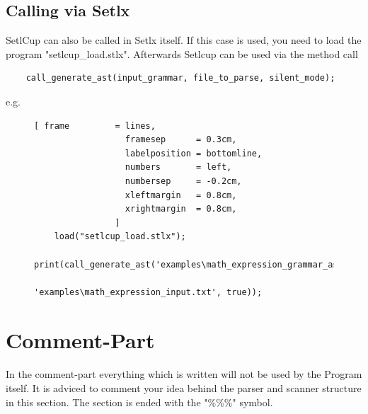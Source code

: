\subsection{Calling via Setlx}
SetlCup can also be called in Setlx itself. If this case is used, you need to load the program "setlcup\_load.stlx".
Afterwards Setlcup can be used via the method call
\begin{Verbatim}
	call_generate_ast(input_grammar, file_to_parse, silent_mode);
\end{Verbatim}

e.g.
\begin{figure}[!ht]
\begin{Verbatim}[ frame         = lines, 
                  framesep      = 0.3cm, 
                  labelposition = bottomline,
                  numbers       = left,
                  numbersep     = -0.2cm,
                  xleftmargin   = 0.8cm,
                  xrightmargin  = 0.8cm,
                ]
	load("setlcup_load.stlx");
	print(call_generate_ast('examples\math_expression_grammar_ast.g', 
	                    'examples\math_expression_input.txt', true));
\end{Verbatim}
\end{figure}
\section{Comment-Part}
In the comment-part everything which is written will not be used by the Program itself. It is adviced to comment your idea behind the parser and scanner structure in this section.
The section is ended with the "\%\%\%" symbol.

